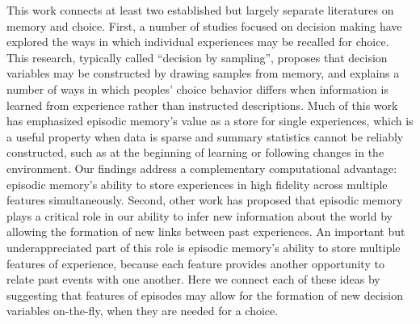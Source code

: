 \documentclass[10pt,letterpaper]{article}
\begin{document}
This work connects at least two established but largely separate literatures on memory and choice. First, a number of studies focused on decision making have explored the ways in which individual experiences may be recalled for choice\cite{STEWART20061, bieleLearningRiskAttitude2009,plonskyRelianceSmallSamples2015, shadlenDecisionMakingSequential2016, wangMixingMemoryDesire2022}. This research, typically called ``decision by sampling'', proposes that decision variables may be constructed by drawing samples from memory, and explains a number of ways in which peoples' choice behavior differs when information is learned from experience rather than instructed descriptions\cite{hertwigDescriptionExperienceGap2009}. Much of this work has emphasized episodic memory's value as a store for single experiences, which is a useful property when data is sparse and summary statistics cannot be reliably constructed, such as at the beginning of learning or following changes in the environment\cite{lengyelHippocampalContributionsControl2008, nicholasUncertaintyAltersBalance2022a}. Our findings address a complementary computational advantage: episodic memory's ability to store experiences in high fidelity across multiple features simultaneously. Second, other work has proposed that episodic memory plays a critical role in our ability to infer new information about the world by allowing the formation of new links between past experiences\cite{schlichtingHippocampusMemoryIntegration2017,whittingtonTolmanEichenbaumMachineUnifying2020,bidermanWhatAreMemories2020}. An important but underappreciated part of this role is episodic memory's ability to store multiple features of experience, because each feature provides another opportunity to relate past events with one another. Here we connect each of these ideas by suggesting that features of episodes may allow for the formation of new decision variables on-the-fly, when they are needed for a choice.
\end{document}
